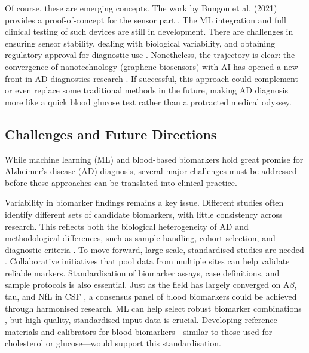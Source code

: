 \documentclass[a4paper,12pt]{article}
\begin{document}
Of course, these are emerging concepts. The work by Bungon et al. (2021) provides a proof-of-concept for the sensor part \cite{bungon2021graphene}. The ML integration and full clinical testing of such devices are still in development. There are challenges in ensuring sensor stability, dealing with biological variability, and obtaining regulatory approval for diagnostic use \cite{krishnan2023graphene}. Nonetheless, the trajectory is clear: the convergence of nanotechnology (graphene biosensors) with AI has opened a new front in AD diagnostics research \cite{flynn2024artificial}. If successful, this approach could complement or even replace some traditional methods in the future, making AD diagnosis more like a quick blood glucose test rather than a protracted medical odyssey.


\subsection{Challenges and Future Directions}
While machine learning (ML) and blood-based biomarkers hold great promise for Alzheimer’s disease (AD) diagnosis, several major challenges must be addressed before these approaches can be translated into clinical practice.

Variability in biomarker findings remains a key issue. Different studies often identify different sets of candidate biomarkers, with little consistency across research. This reflects both the biological heterogeneity of AD and methodological differences, such as sample handling, cohort selection, and diagnostic criteria \cite{jammeh2016identification}. To move forward, large-scale, standardised studies are needed \cite{hampel2018blood}. Collaborative initiatives that pool data from multiple sites can help validate reliable markers. Standardisation of biomarker assays, case definitions, and sample protocols is also essential. Just as the field has largely converged on A$\beta$, tau, and NfL in CSF \cite{blennow2009csf}, a consensus panel of blood biomarkers could be achieved through harmonised research. ML can help select robust biomarker combinations \cite{winchester2023artificial}, but high-quality, standardised input data is crucial. Developing reference materials and calibrators for blood biomarkers—similar to those used for cholesterol or glucose—would support this standardisation.
\end{document}

